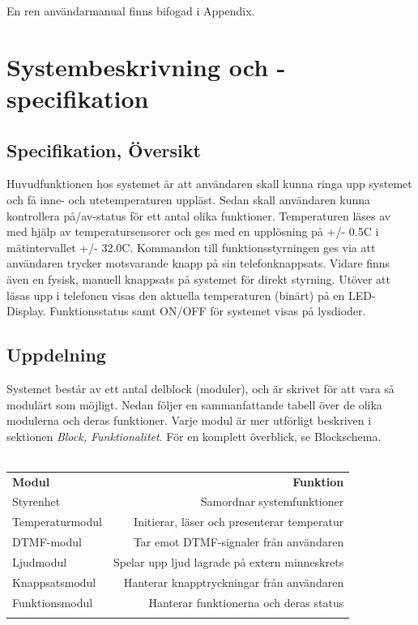\documentclass[a4paper,11pt]{article}
\begin{document}
	En ren användarmanual finns bifogad i Appendix.

\pagebreak

\section{Systembeskrivning och -specifikation}

	\subsection{Specifikation, Översikt}

	Huvudfunktionen hos systemet är att användaren skall kunna ringa upp systemet och få inne- och utetemperaturen
	uppläst. Sedan skall användaren kunna kontrollera på/av-status för ett antal olika funktioner. Temperaturen
	läses av med hjälp av temperatursensorer och ges med en upplösning på +/- 0.5C i mätintervallet +/- 32.0C.
	Kommandon till funktionsstyrningen ges via att användaren trycker motsvarande knapp på sin telefonknappsats.
	Vidare finns även en fysisk, manuell knappsats på systemet för direkt styrning. Utöver att läsas upp i 
	telefonen visas den aktuella temperaturen (binärt) på en LED-Display. Funktionsstatus samt ON/OFF för systemet
	visas på lysdioder.

	\subsection{Uppdelning}

	Systemet består av ett antal delblock (moduler), och är skrivet för att vara så modulärt som möjligt.
	Nedan följer en sammanfattande tabell över de olika modulerna och deras funktioner. Varje modul är mer
	utförligt beskriven i sektionen {\it Block, Funktionalitet}. För en komplett överblick, se Blockschema. \\\\

	\begin{tabular}{ l r}
		{\bf Modul} & {\bf Funktion}\\
	   	Styrenhet & Samordnar systemfunktioner\\
	  	Temperaturmodul & Initierar, läser och presenterar temperatur\\
	   	DTMF-modul & Tar emot DTMF-signaler från användaren\\
		Ljudmodul & Spelar upp ljud lagrade på extern minneskrets\\
		Knappsatsmodul & Hanterar knapptryckningar från användaren\\
		Funktionsmodul & Hanterar funktionerna och deras status\\\\
	\end{tabular}
\end{document}
